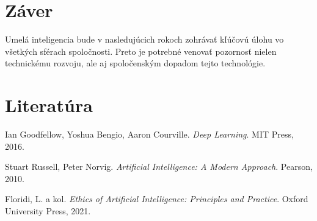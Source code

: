 \documentclass{article}  %
\begin{document}
\section{Záver}
Umelá inteligencia bude v nasledujúcich rokoch zohrávať kľúčovú úlohu vo všetkých sférach spoločnosti. 
Preto je potrebné venovať pozornosť nielen technickému rozvoju, ale aj spoločenským dopadom tejto technológie.

\section{Literatúra}
\begin{thebibliography}{9}
Ian Goodfellow, Yoshua Bengio, Aaron Courville. \emph{Deep Learning}. MIT Press, 2016.

Stuart Russell, Peter Norvig. \emph{Artificial Intelligence: A Modern Approach}. Pearson, 2010.

Floridi, L. a kol. \emph{Ethics of Artificial Intelligence: Principles and Practice}. Oxford University Press, 2021.
\end{thebibliography}
\end{document}
